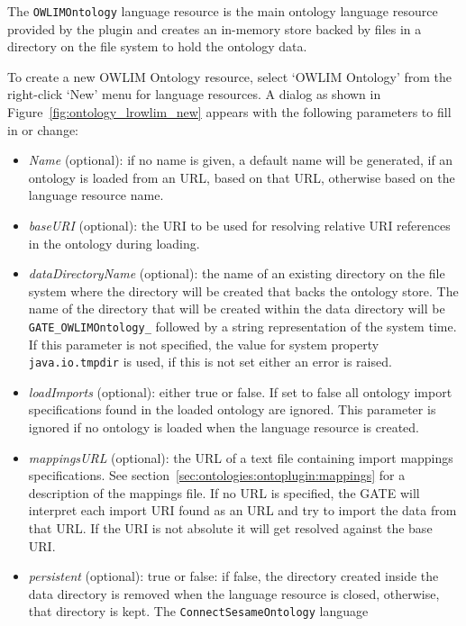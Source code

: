 The \verb!OWLIMOntology! language resource is the main ontology language 
resource provided by the plugin and creates an in-memory store backed
by files in a directory on the file system to hold the ontology
data.

To create a new OWLIM Ontology resource, select `OWLIM Ontology' from
the right-click `New' menu for language resources. A dialog as 
shown in Figure~\ref{fig:ontology_lrowlim_new} appears with the following 
parameters to fill in or change:
\begin{itemize}
 \item \emph{Name} (optional): if no name is given, a default name will be generated, if an
  ontology is loaded from an URL, based on that URL, otherwise based on
  the language resource name.
 \item \emph{baseURI} (optional): the URI to be used for resolving relative URI references 
    in the ontology during loading.
 \item \emph{dataDirectoryName} (optional): the name of an existing directory on the file 
   system where the directory will be created that backs the ontology store.
  The name of the directory that will be created within the data directory
  will be \verb!GATE_OWLIMOntology_! followed by a string representation
  of the system time. If this parameter is not specified, the value for 
  system property \texttt{java.io.tmpdir} is used, if this is not set either
  an error is raised.
 \item \emph{loadImports} (optional): either true or false. If set to false all ontology
 import specifications found in the loaded ontology are ignored. This
  parameter is ignored if no ontology is loaded when the language 
  resource is created. 
  \item \emph{mappingsURL} (optional): the URL of a text file containing import mappings 
  specifications. See section~\ref{sec:ontologies:ontoplugin:mappings} 
  for a description of the mappings file.
  If no URL is specified, the GATE will interpret each import URI found
  as an URL and try to import the data from that URL. If the URI is not absolute 
  it will get resolved against the base URI.
  \item \emph{persistent} (optional): true or false: if false, the directory created inside
  the data directory is removed when the language resource is closed, 
  otherwise, that directory is kept. The \verb!ConnectSesameOntology! language

\end{itemize}

